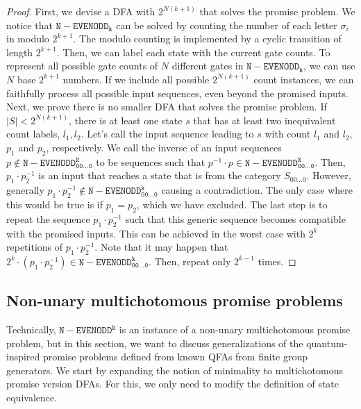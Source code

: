 \documentclass[../main.tex]{subfiles}
\begin{document}
\begin{proof}
    First, we devise a DFA with $2^{N(k+1)}$ that solves the promise problem. We notice that $\operatorname{\mathtt{N-EVENODD_k}}$ can be solved by counting the number of each letter $\sigma_i$ in modulo $2^{k+1}$. The modulo counting is implemented by a cyclic transition of length $2^{k+1}$. Then, we can label each state with the current gate counts. To represent all possible gate counts of $N$ different gates in $\operatorname{\mathtt{N-EVENODD_k}}$, we can use $N$ base $2^{k+1}$ numbers. If we include all possible $2^{N(k+1)}$ count instances, we can faithfully process all possible input sequences, even beyond the promised inputs.
    Next, we prove there is no smaller DFA that solves the promise problem. If $|S|<2^{N(k+1)}$, there is at least one state $s$ that has at least two inequivalent count labels, $l_1,l_2$. Let's call the input sequence leading to $s$ with count $l_1$ and $l_2$, $p_1$ and $p_2$, respectively. We call the inverse of an input sequences $p \notin \operatorname{\mathtt{N-EVENODD^k_{00\dots0}}}$ to be sequences such that  $p^{-1}\cdot p \in  \operatorname{\mathtt{N-EVENODD^k_{00\dots0}}}$. Then, $p_1 \cdot p_2^{-1}$ is an input that reaches a state that is from the category $S_{00\dots0}$. However, generally $p_1 \cdot p_2^{-1} \notin \operatorname{\mathtt{N-EVENODD^k_{00\dots0}}}$ causing a contradiction. The only case where this would be true is if $p_1 = p_2$, which we have excluded. The last step is to repeat the sequence $p_1 \cdot p_2^{-1}$ such that this generic sequence becomes compatible with the promised inputs. This can be achieved in the worst case with $2^k$ repetitions of $p_1 \cdot p_2^{-1}$. Note that it may happen that $2^k\cdot(p_1 \cdot p_2^{-1}) \in \operatorname{\mathtt{N-EVENODD^k_{00\dots0}}}$. Then, repeat only $2^{k-1}$ times.
\end{proof}


\subsection{Non-unary multichotomous promise problems}

Technically, $\operatorname{\mathtt{N-EVENODD^k}}$ is an instance of a non-unary multichotomous promise problem, but in this section, we want to discuss generalizations of the quantum-inspired promise problems defined from known QFAs from finite group generators. 
We start by expanding the notion of minimality to multichotomous promise version DFAs. For this, we only need to modify the definition of state equivalence.
\end{document}
